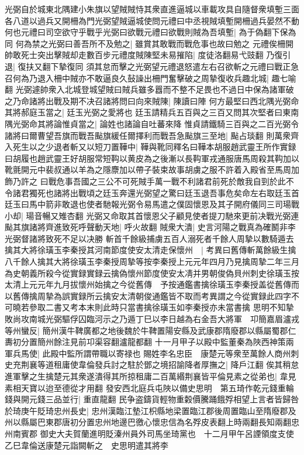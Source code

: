 光弼自於城東北隅建小朱旗以望賊賊恃其衆直進逼城以車載攻具自隨督衆填塹三面各八道以過兵又開柵為門光弼望賊逼城使問元禮曰中丞視賊填塹開柵過兵晏然不動何也元禮曰司空欲守乎戰乎光弼曰欲戰元禮曰欲戰則賊為吾填塹|{
	為于偽翻下保為同}
何為禁之光弼曰善吾所不及勉之|{
	雖賞其敢戰而戰危事也故曰勉之}
元禮俟柵開帥敢死士突出擊賊却走數百步元禮度賊陳堅未易摧陷|{
	度徒洛翻易弋豉翻}
乃復引退|{
	復扶又翻下摯復同}
須其怠而擊之光弼望元禮退怒遣左右召欲斬之元禮曰戰正急召何為乃退入柵中賊亦不敢逼良久鼔譟出柵門奮擊破之周摯復收兵趣北城|{
	趣七喻翻}
光弼遽帥衆入北城登城望賊曰賊兵雖多囂而不整不足畏也不過日中保為諸軍破之乃命諸將出戰及期不决召諸將問曰向來賊陳|{
	陳讀曰陣}
何方最堅曰西北隅光弼命其將郝庭玉當之|{
	廷玉光弼之愛將也}
廷玉請精兵五百與之三百又問其次堅者曰東南隅光弼命其將論惟貞當之|{
	論姓也諸論自吐蕃來降}
惟貞請鐵騎三百與之二百光弼令諸將曰爾曹望吾旗而戰吾颭旗緩任爾擇利而戰吾急颭旗三至地|{
	颭占琰翻}
則萬衆齊入死生以之少退者斬又以短刀置鞾中|{
	鞾與靴同釋名曰鞾本胡服趙武靈王所作實録曰胡履也趙武靈王好胡服常短䩓以黄皮為之後漸以長䩓軍戎通服唐馬周殺其䩓加以靴氈開元中裴叔通以羊為之隱麖加以帶子裝束故事胡虜之服不許着入殿省至馬周加飾乃許之}
曰戰危事吾國之三公不可死賊手萬一戰不利諸君前死於敵我自剄於此不令諸君獨死也諸將出戰頃之廷玉奔還光弼望之驚曰廷玉退吾事危矣命左右取廷玉首廷玉曰馬中箭非敢退也使者馳報光弼令易馬遣之僕固懷恩及其子開府儀同三司瑒戰小却|{
	瑒音暢又雉杏翻}
光弼又命取其首懷恩父子顧見使者提刀馳來更前决戰光弼連颭其旗諸將齊進致死呼聲動天地|{
	呼火故翻}
賊衆大潰|{
	史言河陽之戰真為確鬭非李光弼督諸將致死不足以决勝}
斬首千餘級捕虜五百人溺死者千餘人周摯以數騎遁去擒其大將徐璜玉李秦授其河南節度使安太清走保懷州　|{
	考異曰舊傳斬萬餘級生擒八千餘人擒其大將徐璜玉李秦授周摯等按李秦授上元元年四月乃見擒周摯二年三月為史朝義所殺今從實録實録云擒偽懷州節度使安太凊并男朝俊偽貝州刺史徐璜玉按太清上元元年九月拔懷州始擒之今從舊傳　予按通鑑書擒徐璜玉李秦授盖從舊傳而以舊傳擒周摯為誤實録所云擒安太清朝俊通鑑皆不取而考異謂之今從實録此四字不可曉若參取二書又考本末則此時只當書擒徐璜玉如李秦授亦未當書擒}
思明不知摯敗尚攻南城光弼驅俘囚臨河示之乃遁丁巳以李日越為右金吾大將軍　卭簡嘉眉瀘戎等州蠻反|{
	簡州漢牛鞞廣都之地後魏於牛鞞置陽安縣及武康郡隋廢郡以縣屬蜀郡仁夀初分置簡州餘注見前卭渠容翻瀘龍都翻}
十一月甲子以殿中監董秦為陜西神策兩軍兵馬使|{
	此殿中監所謂帶職以寄禄也}
賜姓李名忠臣　康楚元等衆至萬餘人商州刺史充荆襄等道租庸使韋倫發兵討之駐於鄧之境招諭降者厚撫之|{
	降戶江翻}
俟其稍怠進軍擊之生擒楚元其衆遂潰得其所掠租庸二百萬緡荆襄皆平倫見素之從弟也|{
	韋見素相天寶以迨至德從才用翻}
發安西北庭兵屯陜以備史思明　第五琦作乾元錢重輪錢與開元錢三品並行|{
	重直龍翻}
民争盗鑄貨輕物重糓價騰踊餓殍相望上言者皆歸咎於琦庚午貶琦忠州長史|{
	忠州漢臨江墊江枳縣地梁置臨江郡後周置臨山至隋廢郡及州以縣屬巴東郡唐初分置忠州地邊巴徼心懷忠信為名殍皮表翻上時兩翻長知兩翻忠州南賓郡}
御史大夫賀蘭進明貶溱州員外司馬坐琦黨也　十二月甲午呂諲領度支使乙巳韋倫送康楚元詣闕斬之　史思明遣其將李

